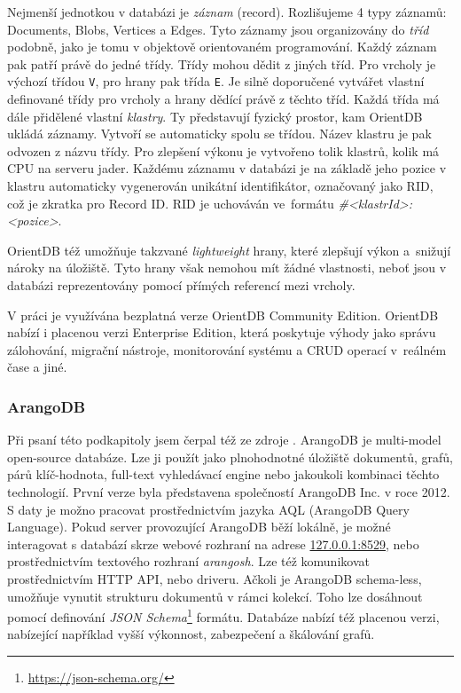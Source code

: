 \documentclass[
  program=infoi,
  biblatex=true,
  figures=true,
  glossaries=false,
  index,
  sourcecodes=true
]{kidiplom}
\begin{document}
Nejmenší jednotkou v databázi je \textit{záznam} (record). Rozlišujeme 4 typy záznamů: Documents, Blobs, Vertices a Edges. Tyto záznamy jsou organizovány do \textit{tříd} podobně, jako je tomu v objektově orientovaném programování. Každý záznam pak patří právě do jedné třídy. Třídy mohou dědit z jiných tříd. Pro vrcholy je výchozí třídou \texttt{V}, pro hrany pak třída \texttt{E}. Je silně doporučené vytvářet vlastní definované třídy pro vrcholy a hrany dědící právě z těchto tříd. Každá třída má dále přidělené vlastní \textit{klastry}. Ty představují fyzický prostor, kam OrientDB ukládá záznamy. Vytvoří se automaticky spolu se třídou. Název klastru je pak odvozen z názvu třídy. Pro zlepšení výkonu je vytvořeno tolik klastrů, kolik má CPU na serveru jader. Každému záznamu v databázi je na základě jeho pozice v klastru automaticky vygenerován unikátní identifikátor, označovaný jako RID, což je zkratka pro Record ID. RID je uchováván ve~formátu \textit{\#<klastrId>:<pozice>}.

OrientDB též umožňuje takzvané \textit{lightweight} hrany, které zlepšují výkon a~snižují nároky na úložiště. Tyto hrany však nemohou mít žádné vlastnosti, neboť jsou v databázi reprezentovány pomocí přímých referencí mezi vrcholy.

V práci je využívána bezplatná verze OrientDB Community Edition. OrientDB nabízí i placenou verzi Enterprise Edition, která poskytuje výhody jako správu zálohování, migrační nástroje, monitorování systému a CRUD operací v~reálném čase a jiné.

\subsubsection{ArangoDB}
Při psaní této podkapitoly jsem čerpal též ze zdroje \cite{arangoDBDoc}. ArangoDB je multi-model open-source databáze. Lze ji použít jako plnohodnotné úložiště dokumentů, grafů, párů klíč-hodnota, full-text vyhledávací engine nebo jakoukoli kombinaci těchto technologií. První verze byla představena společností ArangoDB Inc. v roce 2012. S daty je možno pracovat prostřednictvím jazyka AQL (ArangoDB Query Language). Pokud server provozující ArangoDB běží lokálně, je možné interagovat s databází skrze webové rozhraní na adrese \url{127.0.0.1:8529}, nebo prostřednictvím textového rozhraní \textit{arangosh}. Lze též komunikovat prostřednictvím HTTP API, nebo driveru. Ačkoli je ArangoDB schema-less, umožňuje vynutit strukturu dokumentů v rámci kolekcí. Toho lze dosáhnout pomocí definování \textit{JSON Schema}\footnote{\url{https://json-schema.org/}} formátu. Databáze nabízí též placenou verzi, nabízející například vyšší výkonnost, zabezpečení a škálování grafů.
\end{document}
